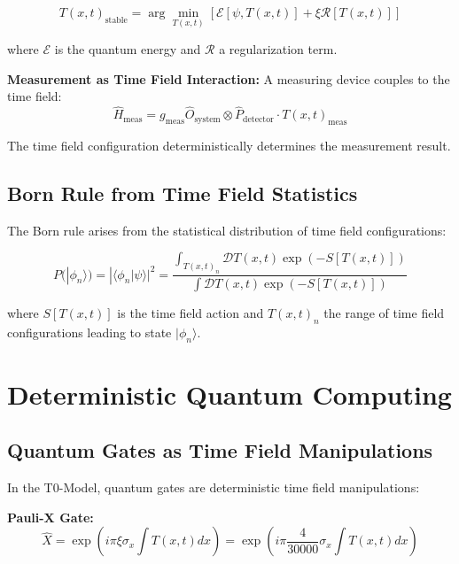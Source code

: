 \documentclass[12pt,a4paper]{report}
\newcommand{\Tfield}{T(x,t)}  %
\newcommand{\xipar}{\xi}      %
\begin{document}
	\begin{equation}\label{eq:timefield_stabilization}
		\Tfield_{\text{stable}} = \arg\min_{\Tfield} \left[\mathcal{E}[\psi, \Tfield] + \xipar \mathcal{R}[\Tfield]\right]
	\end{equation}
	
	where $\mathcal{E}$ is the quantum energy and $\mathcal{R}$ a regularization term.
	
	\textbf{Measurement as Time Field Interaction:}
	A measuring device couples to the time field:
	\begin{equation}
		\hat{H}_{\text{meas}} = g_{\text{meas}} \hat{O}_{\text{system}} \otimes \hat{P}_{\text{detector}} \cdot \Tfield_{\text{meas}}
	\end{equation}
	
	The time field configuration deterministically determines the measurement result.
	
	\subsection{Born Rule from Time Field Statistics}\label{subsec:born_rule}
	
	The Born rule arises from the statistical distribution of time field configurations:
	
	\begin{equation}\label{eq:born_rule_t0}
		P(|\phi_n\rangle) = |\langle \phi_n | \psi \rangle|^2 = \frac{\int_{\Tfield_n} \mathcal{D}\Tfield \exp(-S[\Tfield])}{\int \mathcal{D}\Tfield \exp(-S[\Tfield])}
	\end{equation}
	
	where $S[\Tfield]$ is the time field action and $\Tfield_n$ the range of time field configurations leading to state $|\phi_n\rangle$.
	
	\section{Deterministic Quantum Computing}\label{sec:deterministic_quantum_computing}
	
	\subsection{Quantum Gates as Time Field Manipulations}\label{subsec:quantum_gates_timefield}
	
	In the T0-Model, quantum gates are deterministic time field manipulations:
	
	\textbf{Pauli-X Gate:}
	\begin{equation}
		\hat{X} = \exp\left(i\pi \xipar \sigma_x \int \Tfield dx\right) = \exp\left(i\pi \frac{4}{30000} \sigma_x \int \Tfield dx\right)
	\end{equation}
	
\end{document}
